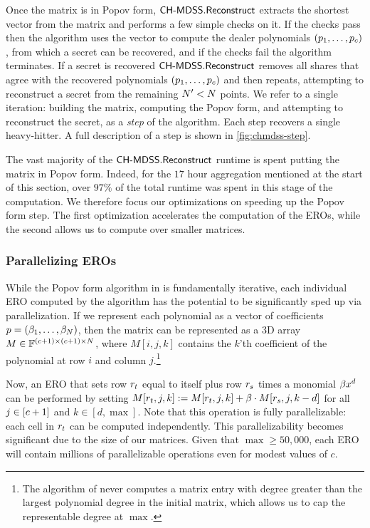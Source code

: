 Once the matrix is in Popov form, ${\sf CH\text{-}MDSS}.\mathsf{Reconstruct}$ extracts the shortest vector from the matrix and performs a few simple checks on it.
If the checks pass then the algorithm uses the vector to compute the dealer polynomials $(p_1,\dots,p_{c})$, from which a secret can be recovered, and if the checks fail the algorithm terminates.
If a secret is recovered ${\sf CH\text{-}MDSS}.\mathsf{Reconstruct}$ removes all shares that agree with the recovered polynomials $(p_1,\dots,p_{c})$ and then repeats, attempting to reconstruct a secret from the remaining $N' < N$ points.
We refer to a single iteration: building the matrix, computing the Popov form, and attempting to reconstruct the secret, as a \emph{step} of the algorithm.
Each step recovers a single heavy-hitter.
A full description of a step is shown in \cref{fig:chmdss-step}.



The vast majority of the ${\sf CH\text{-}MDSS}.\mathsf{Reconstruct}$ runtime is spent putting the matrix in Popov form.
Indeed, for the $17$ hour aggregation mentioned at the start of this section, over $97\%$ of the total runtime was spent in this stage of the computation.
We therefore focus our optimizations on speeding up the Popov form step.
The first optimization accelerates the computation of the EROs, while the second allows us to compute over smaller matrices.


\subsubsection{Parallelizing EROs}

While the Popov form algorithm in \cite{mulders2003lattice} is fundamentally iterative, each individual ERO computed by the algorithm has the potential to be significantly sped up via parallelization.
If we represent each polynomial as a vector of coefficients $p = (\beta_1, \dots, \beta_{N})$, then the matrix can be represented as a 3D array $M \in \mathbb{F}^{(c + 1) \times (c + 1) \times N}$, where $M[i, j, k]$ contains the $k$'th coefficient of the polynomial at row $i$ and column $j$.\footnote{The algorithm of \cite{mulders2003lattice} never computes a matrix entry with degree greater than the largest polynomial degree in the initial matrix, which allows us to cap the representable degree at $\max$.}

Now, an ERO that sets row $r_t$ equal to itself plus row $r_s$ times a monomial $\beta x^d$ can be performed by setting $M[r_t, j, k] := M[r_t, j, k] + \beta \cdot M[r_s, j, k - d]$ for all $j \in [c + 1]$ and $k \in [d, \max]$.
Note that this operation is fully parallelizable: each cell in $r_t$ can be computed independently.
This parallelizability becomes significant due to the size of our matrices.
Given that $\max \geq 50,000$, each ERO will contain millions of parallelizable operations even for modest values of $c$.

